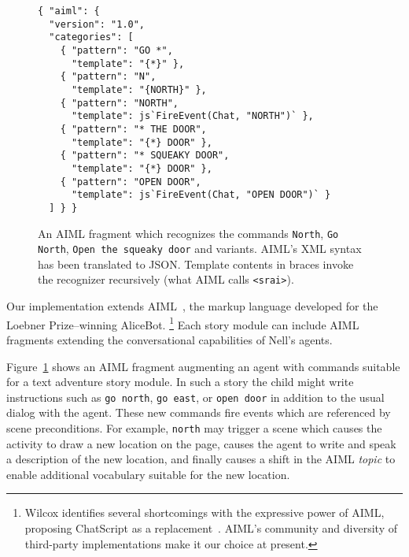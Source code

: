 \documentclass{sig-alternate}
\begin{document}
\begin{figure}\small
\begin{verbatim}
{ "aiml": {
  "version": "1.0",
  "categories": [
    { "pattern": "GO *",
      "template": "{*}" },
    { "pattern": "N",
      "template": "{NORTH}" },
    { "pattern": "NORTH",
      "template": js`FireEvent(Chat, "NORTH")` },
    { "pattern": "* THE DOOR",
      "template": "{*} DOOR" },
    { "pattern": "* SQUEAKY DOOR",
      "template": "{*} DOOR" },
    { "pattern": "OPEN DOOR",
      "template": js`FireEvent(Chat, "OPEN DOOR")` }
  ] } }
\end{verbatim}
\caption{An AIML fragment which recognizes the commands
  \texttt{North}, \texttt{Go North}, \texttt{Open the squeaky door}
  and variants.  AIML's XML syntax has been translated to JSON.
  Template contents in braces invoke the recognizer recursively
  (what AIML calls \texttt{<srai>}).
}\label{fig:aiml}
\end{figure}

Our implementation extends AIML~\cite{aiml:2005},
the markup language developed for the Loebner Prize--winning
AliceBot.%
\footnote{Wilcox identifies several shortcomings with the expressive
  power of AIML, proposing ChatScript as a
  replacement~\cite{wilcox:2010}.  AIML's community and
  diversity of third-party implementations make it our choice at present.}
Each story module can include AIML fragments extending the
conversational capabilities of Nell's agents.

Figure~\ref{fig:aiml}
shows an AIML fragment augmenting an agent with
commands suitable for a text adventure story module.
In such a story the child might write instructions such as
\texttt{go north}, \texttt{go east}, or \texttt{open door} in
addition to the usual dialog with the agent.
These new commands fire events which are referenced by scene
preconditions.  For example, \texttt{north} may
trigger a scene which causes the activity to draw a new location on
the page, causes the agent to write and speak a description of the new
location, and finally causes a shift in the AIML \textit{topic} to
enable additional vocabulary suitable for the new location.
\end{document}
